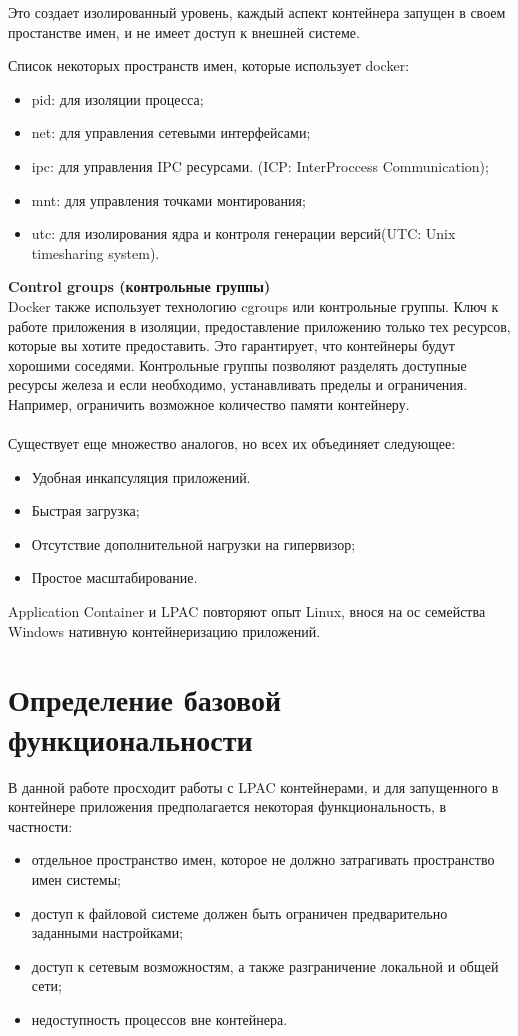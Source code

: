 Это создает изолированный уровень, каждый аспект контейнера запущен в своем простанстве имен, и не имеет доступ к внешней системе.

Список некоторых пространств имен, которые использует docker:
\begin{itemize}
\item pid: для изоляции процесса;
\item net: для управления сетевыми интерфейсами;
\item ipc: для управления IPC ресурсами. (ICP: InterProccess Communication);
\item mnt: для управления точками монтирования;
\item utc: для изолирования ядра и контроля генерации версий(UTC: Unix timesharing system).
\end{itemize}
\textbf{Control groups (контрольные группы)}\\
Docker также использует технологию cgroups или контрольные группы. Ключ к работе приложения в изоляции, предоставление приложению только тех ресурсов, которые вы хотите предоставить. Это гарантирует, что контейнеры будут хорошими соседями. Контрольные группы позволяют разделять доступные ресурсы железа и если необходимо, устанавливать пределы и ограничения. Например, ограничить возможное количество памяти контейнеру.\\\\
Существует еще множество аналогов, но всех их объединяет следующее:
\begin{itemize}
\item Удобная инкапсуляция приложений.
\item Быстрая загрузка;
\item Отсутствие дополнительной нагрузки на гипервизор;
\item Простое масштабирование.
\end{itemize}
Application Container и LPAC повторяют опыт Linux, внося на ос семейства Windows нативную контейнеризацию приложений.


\section{Определение базовой функциональности}
В данной работе просходит работы с LPAC контейнерами, и для запущенного в контейнере приложения предполагается некоторая функциональность, в частности:
\begin{itemize}
\item отдельное пространство имен, которое не должно затрагивать пространство имен системы;
\item доступ к файловой системе должен быть ограничен предварительно заданными настройками;
\item доступ к сетевым возможностям, а также разграничение локальной и общей сети;
\item недоступность процессов вне контейнера.
\end{itemize}

